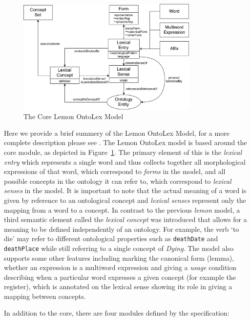 \documentclass[12pt,a4paper]{elex2017}
\begin{document}
\begin{figure}
    \begin{center}
\includegraphics[width=0.8\textwidth]{LemonOntoLexCore.pdf}
    \end{center}
\caption{\label{fig:core}The Core Lemon OntoLex Model}
\end{figure}

Here we provide a brief summery of the Lemon OntoLex Model, for a more complete
description please see \cite{cimiano2016lexicon}.
The Lemon OntoLex model is based around the core module, as depicted in
Figure~\ref{fig:core}. The primary element of this is the \emph{lexical entry}
which represents a single word and thus collects together all morphological
expressions of that word, which correspond to \emph{forms} in the model, and all
possible concepts in the ontology it can refer to, which correspond to
\emph{lexical senses} in the model. It is important to note that the actual
meaning of a word is given by reference to an ontological concept and
\emph{lexical senses} represent only the mapping from a word to a concept. In
contrast to the previous \emph{lemon} model, a third semantic element called the
\emph{lexical concept} was introduced that allows for a meaning to be defined
independently of an ontology. For example, the verb `to die' may refer to
different ontological properties such as \texttt{deathDate} and \texttt{deathPlace} while
still referring to a single concept of \emph{Dying}. The model also supports
some other features including marking the canonical form (lemma), whether an
expression is a multiword expression and giving a \emph{usage} condition
describing when a particular word expresses a given concept (for example the
register), which is annotated on the lexical sense showing its role in giving a
mapping between concepts.


In addition to the core, there are four modules defined by the specification:
\end{document}
